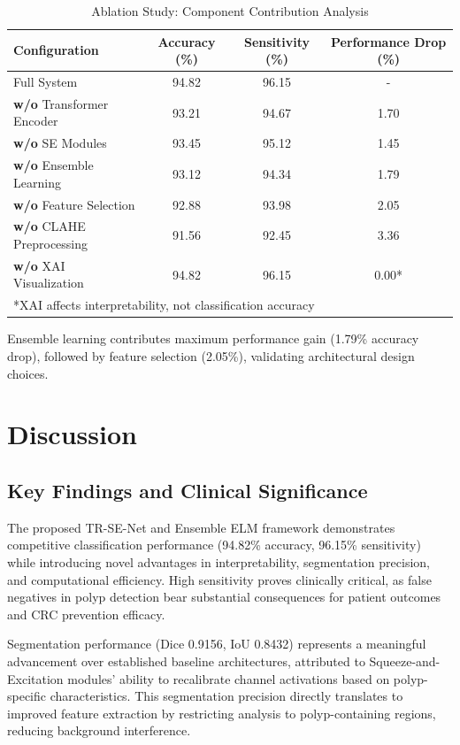 \documentclass[11pt,a4paper]{article}
\begin{document}
\begin{table}[H]
\centering
\caption{Ablation Study: Component Contribution Analysis}
\begin{tabular}{lccc}
\toprule
\textbf{Configuration} & \textbf{Accuracy (\%)} & \textbf{Sensitivity (\%)} & \textbf{Performance Drop (\%)} \\
\midrule
Full System & 94.82 & 96.15 & - \\
\textbf{w/o} Transformer Encoder & 93.21 & 94.67 & 1.70 \\
\textbf{w/o} SE Modules & 93.45 & 95.12 & 1.45 \\
\textbf{w/o} Ensemble Learning & 93.12 & 94.34 & 1.79 \\
\textbf{w/o} Feature Selection & 92.88 & 93.98 & 2.05 \\
\textbf{w/o} CLAHE Preprocessing & 91.56 & 92.45 & 3.36 \\
\textbf{w/o} XAI Visualization & 94.82 & 96.15 & 0.00* \\
\bottomrule
\multicolumn{4}{l}{*XAI affects interpretability, not classification accuracy}
\end{tabular}
\label{tab:ablation}
\end{table}

Ensemble learning contributes maximum performance gain (1.79\% accuracy drop), followed by feature selection (2.05\%), validating architectural design choices.

\section{Discussion}
\label{sec:discussion}

\subsection{Key Findings and Clinical Significance}

The proposed TR-SE-Net and Ensemble ELM framework demonstrates competitive classification performance (94.82\% accuracy, 96.15\% sensitivity) while introducing novel advantages in interpretability, segmentation precision, and computational efficiency. High sensitivity proves clinically critical, as false negatives in polyp detection bear substantial consequences for patient outcomes and CRC prevention efficacy.

Segmentation performance (Dice 0.9156, IoU 0.8432) represents a meaningful advancement over established baseline architectures, attributed to Squeeze-and-Excitation modules' ability to recalibrate channel activations based on polyp-specific characteristics. This segmentation precision directly translates to improved feature extraction by restricting analysis to polyp-containing regions, reducing background interference.
\end{document}
